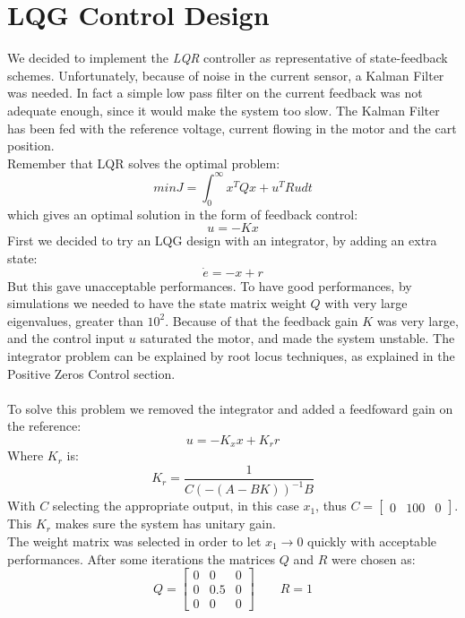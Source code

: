 \section{LQG Control Design}
We decided to implement the \emph{LQR} controller as representative of state-feedback schemes. Unfortunately, because of noise in the current sensor, a Kalman Filter was needed. In fact a simple low pass filter on the current feedback was not adequate enough, since it would make the system too slow. The Kalman Filter has been fed with the reference voltage, current flowing in the motor and the cart position.\\

Remember that LQR solves the optimal problem:
\begin{equation}
min J = \int_0^{\infty} x^T Q x + u^T R u dt
\end{equation}
which gives an optimal solution in the form of feedback control:
\begin{equation}
u=-Kx
\end{equation}
First we decided to try an LQG design with an integrator, by adding an extra state: 
\begin{equation}
\dot{e} = -x+r
\end{equation}
But this gave unacceptable performances. To have good performances, by simulations we needed to have the state matrix weight $Q$ with very large eigenvalues, greater than $10^2$. Because of that the feedback gain $K$ was very large, and the control input $u$ saturated the motor, and made the system unstable. The integrator problem can be explained by root locus techniques, as explained in the Positive Zeros Control section. \\ \\
To solve this problem we removed the integrator and added a feedfoward gain on the reference:
\begin{equation}
u=-K_{x} x+ K_{r} r
\end{equation}
Where $K_{r}$ is:
\begin{equation}
K_{r} = \frac{1}{C(-(A-BK))^{-1}B}
\end{equation}
With $C$ selecting the appropriate output, in this case $x_1$, thus $C=\begin{bmatrix}0 & 100 & 0\end{bmatrix}$. This $K_r$ makes sure the system has unitary gain. \\
The weight matrix was selected in order to let $x_1 \to 0$ quickly with acceptable performances. After some iterations the matrices $Q$ and $R$ were chosen as:
\begin{equation}
Q = \begin{bmatrix}
0 & 0 & 0 \\ 0 & 0.5 & 0 \\ 0 & 0 &0 
\end{bmatrix}
\qquad
R=1
\end{equation}

